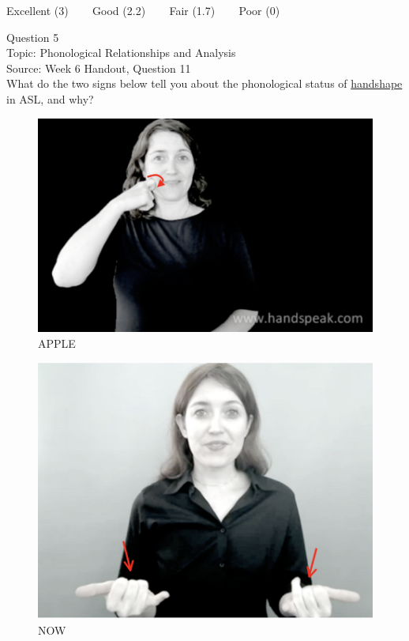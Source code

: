 \documentclass[12pt]{article}
\begin{document}
\vfill
Excellent (3) ~~~ Good (2.2) ~~~ Fair (1.7) ~~~ Poor (0)
\newpage

{\large Question 5}\\

Topic: Phonological Relationships and Analysis\\
Source: Week 6 Handout, Question 11\\

What do the two signs below tell you about the phonological status of \underline{handshape} in ASL, and why?\\

\begin{figure}[H]
\includegraphics{../images/asl_apple.png}
\caption{APPLE}
\end{figure}
\begin{figure}[H]
\includegraphics{../images/asl_now.png}
\caption{NOW}
\end{figure}
\end{document}
